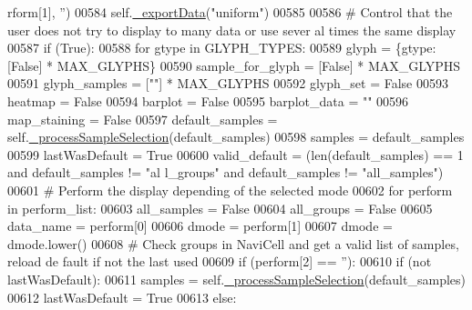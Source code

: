 \begin{DoxyCode}
      rform[1], \textcolor{stringliteral}{''})
00584         self.\hyperlink{classnavicom_1_1navicom_1_1NaviCom_afb8ef6988c65589c35ad11dcb8681787}{_exportData}(\textcolor{stringliteral}{"uniform"})
00585 
00586         \textcolor{comment}{# Control that the user does not try to display to many data or use sever
      al times the same display}
00587         \textcolor{keywordflow}{if} (\textcolor{keyword}{True}):
00588             \textcolor{keywordflow}{for} gtype \textcolor{keywordflow}{in} GLYPH\_TYPES:
00589                 glyph = \{gtype:[\textcolor{keyword}{False}] * MAX\_GLYPHS\}
00590             sample\_for\_glyph = [\textcolor{keyword}{False}] * MAX\_GLYPHS
00591             glyph\_samples = [\textcolor{stringliteral}{""}] * MAX\_GLYPHS
00592             glyph\_set = \textcolor{keyword}{False}
00593             heatmap = \textcolor{keyword}{False}
00594             barplot = \textcolor{keyword}{False}
00595             barplot\_data = \textcolor{stringliteral}{""}
00596             map\_staining = \textcolor{keyword}{False}
00597             default\_samples = self.\hyperlink{classnavicom_1_1navicom_1_1NaviCom_a2acd087f6c61dc8c7e1bc5a3391ff982}{_processSampleSelection}(default\_samples)
00598             samples = default\_samples
00599             lastWasDefault = \textcolor{keyword}{True}
00600             valid\_default = (len(default\_samples) == 1 \textcolor{keywordflow}{and} default\_samples != \textcolor{stringliteral}{"al
      l\_groups"} \textcolor{keywordflow}{and} default\_samples != \textcolor{stringliteral}{"all\_samples"})
00601         \textcolor{comment}{# Perform the display depending of the selected mode}
00602         \textcolor{keywordflow}{for} perform \textcolor{keywordflow}{in} perform\_list:
00603             all\_samples = \textcolor{keyword}{False}
00604             all\_groups = \textcolor{keyword}{False}
00605             data\_name = perform[0]
00606             dmode = perform[1]
00607             dmode = dmode.lower()
00608             \textcolor{comment}{# Check groups in NaviCell and get a valid list of samples, reload de
      fault if not the last used}
00609             \textcolor{keywordflow}{if} (perform[2] == \textcolor{stringliteral}{''}):
00610                 \textcolor{keywordflow}{if} (\textcolor{keywordflow}{not} lastWasDefault):
00611                     samples = self.\hyperlink{classnavicom_1_1navicom_1_1NaviCom_a2acd087f6c61dc8c7e1bc5a3391ff982}{_processSampleSelection}(default\_samples)
00612                     lastWasDefault = \textcolor{keyword}{True}
00613             \textcolor{keywordflow}{else}:

\end{DoxyCode}
